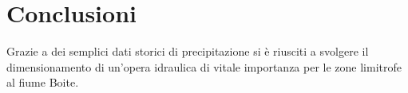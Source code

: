 \section{Conclusioni}
Grazie a dei semplici dati storici di precipitazione si è riusciti a svolgere il dimensionamento di un'opera idraulica di vitale importanza per le zone limitrofe al fiume Boite.